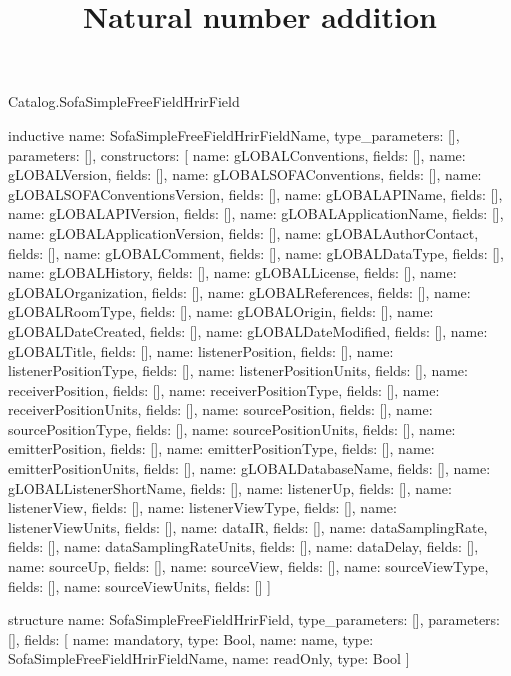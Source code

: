\begin{lexlean}{Catalog.SofaSimpleFreeFieldHrirField}
\title{Natural number addition}
\begin{semanticmodule}
inductive{
  name: SofaSimpleFreeFieldHrirFieldName,
  type_parameters: [],
  parameters: [],
  constructors: [
    {name: gLOBALConventions, fields: []},
    {name: gLOBALVersion, fields: []},
    {name: gLOBALSOFAConventions, fields: []},
    {name: gLOBALSOFAConventionsVersion, fields: []},
    {name: gLOBALAPIName, fields: []},
    {name: gLOBALAPIVersion, fields: []},
    {name: gLOBALApplicationName, fields: []},
    {name: gLOBALApplicationVersion, fields: []},
    {name: gLOBALAuthorContact, fields: []},
    {name: gLOBALComment, fields: []},
    {name: gLOBALDataType, fields: []},
    {name: gLOBALHistory, fields: []},
    {name: gLOBALLicense, fields: []},
    {name: gLOBALOrganization, fields: []},
    {name: gLOBALReferences, fields: []},
    {name: gLOBALRoomType, fields: []},
    {name: gLOBALOrigin, fields: []},
    {name: gLOBALDateCreated, fields: []},
    {name: gLOBALDateModified, fields: []},
    {name: gLOBALTitle, fields: []},
    {name: listenerPosition, fields: []},
    {name: listenerPositionType, fields: []},
    {name: listenerPositionUnits, fields: []},
    {name: receiverPosition, fields: []},
    {name: receiverPositionType, fields: []},
    {name: receiverPositionUnits, fields: []},
    {name: sourcePosition, fields: []},
    {name: sourcePositionType, fields: []},
    {name: sourcePositionUnits, fields: []},
    {name: emitterPosition, fields: []},
    {name: emitterPositionType, fields: []},
    {name: emitterPositionUnits, fields: []},
    {name: gLOBALDatabaseName, fields: []},
    {name: gLOBALListenerShortName, fields: []},
    {name: listenerUp, fields: []},
    {name: listenerView, fields: []},
    {name: listenerViewType, fields: []},
    {name: listenerViewUnits, fields: []},
    {name: dataIR, fields: []},
    {name: dataSamplingRate, fields: []},
    {name: dataSamplingRateUnits, fields: []},
    {name: dataDelay, fields: []},
    {name: sourceUp, fields: []},
    {name: sourceView, fields: []},
    {name: sourceViewType, fields: []},
    {name: sourceViewUnits, fields: []}
  ]
}

structure{
  name: SofaSimpleFreeFieldHrirField,
  type_parameters: [],
  parameters: [],
  fields: [
    {name: mandatory, type: Bool},
    {name: name, type: SofaSimpleFreeFieldHrirFieldName},
    {name: readOnly, type: Bool}
  ]
}
\end{semanticmodule}
\end{lexlean}
